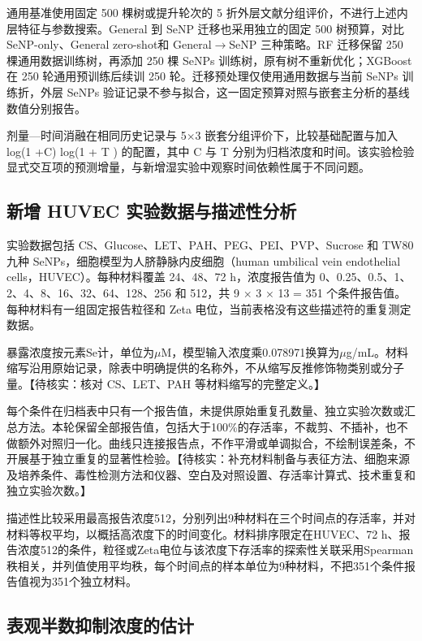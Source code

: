 通用基准使用固定 500 棵树或提升轮次的 5 折外层文献分组评价，不进行上述内层特征与参数搜索。General 到 SeNP 迁移也采用独立的固定 500 树预算，对比 SeNP-only、General zero-shot和 General\ensuremath{\rightarrow}SeNP 三种策略。RF 迁移保留 250 棵通用数据训练树，再添加 250 棵 SeNPs 训练树，原有树不重新优化；XGBoost 在 250 轮通用预训练后续训 250 轮。迁移预处理仅使用通用数据与当前 SeNPs 训练折，外层 SeNPs 验证记录不参与拟合，这一固定预算对照与嵌套主分析的基线数值分别报告。

剂量—时间消融在相同历史记录与 5\ensuremath{\times}3 嵌套分组评价下，比较基础配置与加入 log(1 +C) log(1 + T ) 的配置，其中 C 与 T 分别为归档浓度和时间。该实验检验显式交互项的预测增量，与新增湿实验中观察时间依赖性属于不同问题。

\subsection{新增 HUVEC 实验数据与描述性分析}

实验数据包括 CS、Glucose、LET、PAH、PEG、PEI、PVP、Sucrose 和 TW80 九种 SeNPs，细胞模型为人脐静脉内皮细胞（human umbilical vein endothelial cells，HUVEC）。每种材料覆盖 24、48、72 h，浓度报告值为 0、0.25、0.5、1、2、4、8、16、32、64、128、256 和 512，共 9 \ensuremath{\times} 3 \ensuremath{\times} 13 = 351 个条件报告值。每种材料有一组固定报告粒径和 Zeta 电位，当前表格没有这些描述符的重复测定数据。

暴露浓度按元素Se计，单位为$\mu$M，模型输入浓度乘0.078971换算为$\mu$g/mL。材料缩写沿用原始记录，除表中明确提供的名称外，不从缩写反推修饰物类别或分子量。【待核实：核对 CS、LET、PAH 等材料缩写的完整定义。】

每个条件在归档表中只有一个报告值，未提供原始重复孔数量、独立实验次数或汇总方法。本轮保留全部报告值，包括大于\nobreakspace{}100\%的存活率，不裁剪、不插补，也不做额外对照归一化。曲线只连接报告点，不作平滑或单调拟合，不绘制误差条，不开展基于独立重复的显著性检验。【待核实：补充材料制备与表征方法、细胞来源及培养条件、毒性检测方法和仪器、空白及对照设置、存活率计算式、技术重复和独立实验次数。】

描述性比较采用最高报告浓度512，分别列出9种材料在三个时间点的存活率，并对材料等权平均，以概括高浓度下的时间变化。材料排序限定在HUVEC、72 h、报告浓度512的条件，粒径或Zeta电位与该浓度下存活率的探索性关联采用Spearman秩相关，并列值使用平均秩，每个时间点的样本单位为9种材料，不把351个条件报告值视为351个独立材料。

\subsection{表观半数抑制浓度的估计}


